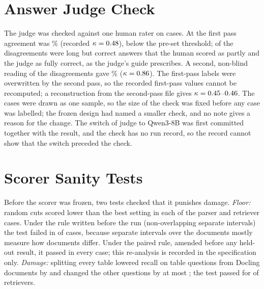 \FloatBarrier
\section{Answer Judge Check}
\label{app:judge}

The judge was checked against one human rater on \JudgeCases{} cases. At
the first pass agreement was \ManualJudgeFirstPassAgreement{}\% (recorded
$\kappa=0.48{}$), below the pre-set threshold;
\ManualJudgeFirstPassLongCorrect{} of the
\ManualJudgeFirstPassDisagreements{} disagreements were long but correct
answers that the human scored as partly and the judge as fully correct,
as the judge's guide prescribes. A second, non-blind reading of the
\JudgeDisagreements{} disagreements gave \JudgeSecondAgreement{}\%
($\kappa=0.86{}$). The first-pass labels were overwritten
by the second pass, so the recorded first-pass values cannot be
recomputed; a reconstruction from the second-pass file gives
$\kappa=0.45{}$--$0.46{}$. The
\JudgeCases{} cases were drawn as one sample, so the size of the check
was fixed before any case was labelled; the frozen design had named a
smaller check, and no note gives a reason for the change. The switch of
judge to Qwen3-8B was first committed together with the result, and the
check has no run record, so the record cannot show that the switch
preceded the check.

\FloatBarrier
\section{Scorer Sanity Tests}
\label{app:sanity}

Before the scorer was frozen, two tests checked that it punishes damage.
\emph{Floor:} random cuts scored \SanityFloorLower{} lower than the best
setting in each of the \SanityFloorCases{} parser and retriever cases.
Under the rule written before the run (non-overlapping separate
intervals) the test failed in \SanityFloorFailedOriginal{} of
\SanityFloorCases{} cases, because separate intervals over the documents
mostly measure how documents differ. Under the paired rule, amended
before any held-out result, it passed in every case; this re-analysis is
recorded in the specification only. \emph{Damage:} splitting every table
lowered recall on \SanityDamageQuestions{} table questions from
\SanityDamageDocuments{} Docling documents by \SanityDamageDrop{} and
changed the other questions by at most \SanityDamageOtherMax{}; the test
passed for \SanityDamagePassed{} of \SanityDamageCases{} retrievers.

